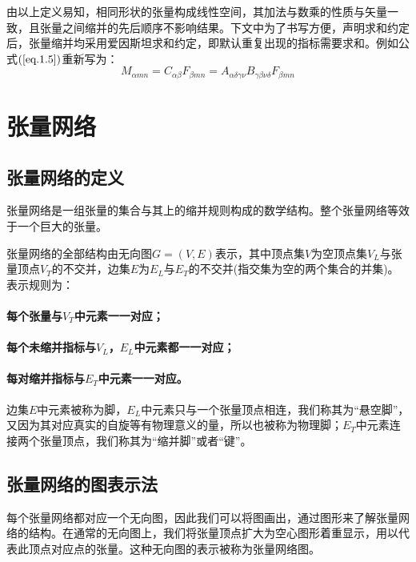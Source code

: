 由以上定义易知，相同形状的张量构成线性空间，其加法与数乘的性质与矢量一致，且张量之间缩并的先后顺序不影响结果。下文中为了书写方便，声明求和约定后，张量缩并均采用爱因斯坦求和约定，即默认重复出现的指标需要求和。例如公式$(\ref{eq.1.5})$重新写为：
\[
M_{\alpha m n} = C_{\alpha\beta} F_{\beta m n}
	= A_{\alpha\delta\gamma\nu} B_{\gamma\beta\nu\delta} F_{\beta m n}
\]


\section{张量网络}

\subsection{张量网络的定义}

张量网络是一组张量的集合与其上的缩并规则构成的数学结构。整个张量网络等效于一个巨大的张量\cite{hsiaoJournalClubBrief}。

张量网络的全部结构由无向图$G=(V,E)$表示，其中顶点集$V$为空顶点集$V_L$与张量顶点$V_T$的不交并，边集$E$为$E_L$与$E_T$的不交并(指交集为空的两个集合的并集)。表示规则为：
\paragraph{每个张量与$V_T$中元素一一对应；}

\paragraph{每个未缩并指标与$V_L$，$E_L$中元素都一一对应；}

\paragraph{每对缩并指标与$E_T$中元素一一对应。}

边集$E$中元素被称为脚，$E_L$中元素只与一个张量顶点相连，我们称其为“悬空脚”，又因为其对应真实的自旋等有物理意义的量，所以也被称为物理脚；$E_T$中元素连接两个张量顶点，我们称其为“缩并脚”或者“键”。

\subsection{张量网络的图表示法}

每个张量网络都对应一个无向图，因此我们可以将图画出，通过图形来了解张量网络的结构。在通常的无向图上，我们将张量顶点扩大为空心图形着重显示，用以代表此顶点对应点的张量。这种无向图的表示被称为张量网络图。


